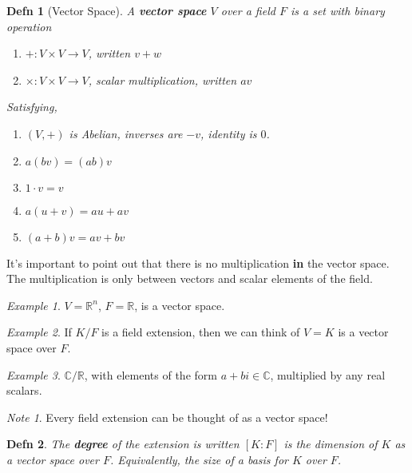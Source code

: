 \documentclass[12pt]{article}
\def\R{{\mathbb R}}
\def\C{{\mathbb C}}
\newtheorem{definition}{Defn}
\theoremstyle{remark}
\theoremstyle{remark}
\theoremstyle{remark}
\newtheorem{example}{Example}
\theoremstyle{remark}
\theoremstyle{remark}
\newtheorem*{note}{Note}
\begin{document}
\begin{definition}[Vector Space]
  A {\bf vector space} $V$ over a field $F$ is a set with binary operation

  \begin{enumerate}
    \item $+: V \times V \to V$, written $v + w$
    \item $\times: V \times V \to V$, scalar multiplication, written $av$
  \end{enumerate}

  Satisfying,

  \begin{enumerate}
    \item $(V, +)$ is Abelian, inverses are $-v$, identity is $0$.
    \item $a(bv) = (ab)v$
    \item $1 \cdot v = v$
    \item $a(u + v) = au + av$
    \item $(a + b)v = av + bv$
  \end{enumerate}
\end{definition}

It's important to point out that there is no multiplication {\bf in} the vector
space. The multiplication is only between vectors and scalar elements of the
field.

\begin{example}
  $V = \R^n$, $F = \R$, is a vector space.
\end{example}

\begin{example}
  If $K / F$ is a field extension, then we can think of $V = K$ is a vector
  space over $F$.
\end{example}

\begin{example}
  $\C / \R$, with elements of the form $a + bi \in \C$, multiplied by any real
  scalars.
\end{example}

\begin{note}
  Every field extension can be thought of as a vector space!
\end{note}

\begin{definition}
  The {\bf degree} of the extension is written $[K : F]$ is the dimension of $K$
  as a vector space over $F$. Equivalently, the size of a basis for $K$ over
  $F$.
\end{definition}
\end{document}
